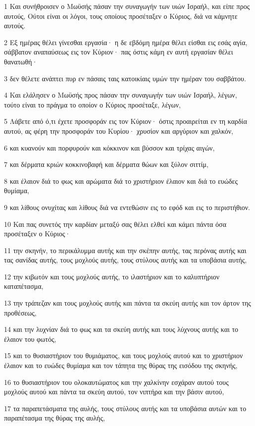 \par 1 Και συνήθροισεν ο Μωϋσής πάσαν την συναγωγήν των υιών Ισραήλ, και είπε προς αυτούς, Ούτοι είναι οι λόγοι, τους οποίους προσέταξεν ο Κύριος, διά να κάμνητε αυτούς.
\par 2 Εξ ημέρας θέλει γίνεσθαι εργασία· η δε εβδόμη ημέρα θέλει είσθαι εις εσάς αγία, σάββατον αναπαύσεως εις τον Κύριον· πας όστις κάμη εν αυτή εργασίαν θέλει θανατωθή·
\par 3 δεν θέλετε ανάπτει πυρ εν πάσαις ταις κατοικίαις υμών την ημέραν του σαββάτου.
\par 4 Και ελάλησεν ο Μωϋσής προς πάσαν την συναγωγήν των υιών Ισραήλ, λέγων, τούτο είναι το πράγμα το οποίον ο Κύριος προσέταξε, λέγων,
\par 5 Λάβετε από ό,τι έχετε προσφοράν εις τον Κύριον· όστις προαιρείται εν τη καρδία αυτού, ας φέρη την προσφοράν του Κυρίου· χρυσίον και αργύριον και χαλκόν,
\par 6 και κυανούν και πορφυρούν και κόκκινον και βύσσον και τρίχας αιγών,
\par 7 και δέρματα κριών κοκκινοβαφή και δέρματα θώων και ξύλον σιττίμ,
\par 8 και έλαιον διά το φως και αρώματα διά το χριστήριον έλαιον και διά το ευώδες θυμίαμα,
\par 9 και λίθους ονυχίτας και λίθους διά να εντεθώσιν εις το εφόδ και εις το περιστήθιον.
\par 10 Και πας συνετός την καρδίαν μεταξύ σας θέλει ελθεί και κάμει πάντα όσα προσέταξεν ο Κύριος·
\par 11 την σκηνήν, το περικάλυμμα αυτής και την σκέπην αυτής, τας περόνας αυτής και τας σανίδας αυτής, τους μοχλούς αυτής, τους στύλους αυτής και τα υποβάσια αυτής,
\par 12 την κιβωτόν και τους μοχλούς αυτής, το ιλαστήριον και το καλυπτήριον καταπέτασμα,
\par 13 την τράπεζαν και τους μοχλούς αυτής και πάντα τα σκεύη αυτής και τον άρτον της προθέσεως,
\par 14 και την λυχνίαν διά το φως και τα σκεύη αυτής και τους λύχνους αυτής και το έλαιον του φωτός,
\par 15 και το θυσιαστήριον του θυμιάματος, και τους μοχλούς αυτού και το χριστήριον έλαιον και το ευώδες θυμίαμα και τον τάπητα της θύρας της εισόδου της σκηνής,
\par 16 το θυσιαστήριον του ολοκαυτώματος και την χαλκίνην εσχάραν αυτού τους μοχλούς αυτού και πάντα τα σκεύη αυτού, τον νιπτήρα και την βάσιν αυτού,
\par 17 τα παραπετάσματα της αυλής, τους στύλους αυτής και τα υποβάσια αυτών και το παραπέτασμα της θύρας της αυλής,
